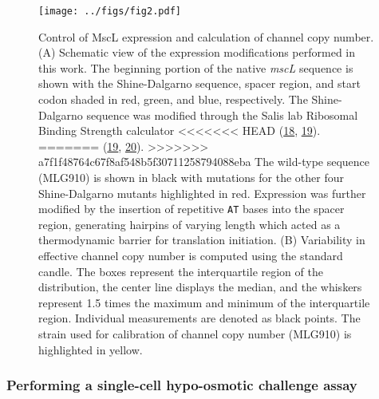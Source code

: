 \begin{figure}
\centering
\texttt{[image: ../figs/fig2.pdf]}
\caption{Control
of
MscL
expression
and
calculation
of
channel
copy
number.
(A)
Schematic
view
of the
expression
modifications
performed
in
this
work.
The
beginning
portion
of the
native
\emph{mscL}
sequence
is
shown
with
the
Shine-Dalgarno
sequence,
spacer
region,
and
start
codon
shaded
in
red,
green,
and
blue,
respectively.
The
Shine-Dalgarno
sequence
was
modified
through
the
Salis
lab
Ribosomal
Binding
Strength
calculator
<<<<<<< HEAD
(\protect\hyperlink{ref-espahborujeni2014}{18},
\protect\hyperlink{ref-salis2009}{19}).
=======
(\protect\hyperlink{ref-espahborujeni2014}{19},
\protect\hyperlink{ref-salis2009}{20}).
>>>>>>> a7f1f48764c67f8af548b5f30711258794088eba
The
wild-type
sequence
(MLG910)
is
shown
in
black
with
mutations
for
the
other
four
Shine-Dalgarno
mutants
highlighted
in
red.
Expression
was
further
modified
by the
insertion
of
repetitive
\texttt{AT}
bases
into
the
spacer
region,
generating
hairpins
of
varying
length
which
acted
as a
thermodynamic
barrier
for
translation
initiation.
(B)
Variability
in
effective
channel
copy
number
is
computed
using
the
standard
candle.
The
boxes
represent
the
interquartile
region
of the
distribution,
the
center
line
displays
the
median,
and
the
whiskers
represent
1.5
times
the
maximum
and
minimum
of the
interquartile
region.
Individual
measurements
are
denoted
as
black
points.
The
strain
used
for
calibration
of
channel
copy
number
(MLG910)
is
highlighted
in
yellow.}\label{fig:boxplot}
\end{figure}

\subsubsection{Performing
a
single-cell
hypo-osmotic
challenge
assay}\label{performing-a-single-cell-hypo-osmotic-challenge-assay}

